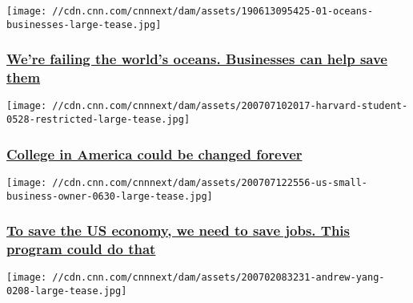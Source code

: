 \texttt{[image: //cdn.cnn.com/cnnnext/dam/assets/190613095425-01-oceans-businesses-large-tease.jpg]}

\hypertarget{were-failing-the-worlds-oceans-businesses-can-help-save-them}{%
\subsubsection{\texorpdfstring{\href{/2019/06/14/perspectives/marc-benioff-marco-lambertini-oceans-businesses/index.html}{We're
failing the world's oceans. Businesses can help save
them}}{We're failing the world's oceans. Businesses can help save them}}\label{were-failing-the-worlds-oceans-businesses-can-help-save-them}}

\href{/2020/07/07/perspectives/higher-education-pandemic/index.html}{}

\texttt{[image: //cdn.cnn.com/cnnnext/dam/assets/200707102017-harvard-student-0528-restricted-large-tease.jpg]}

\hypertarget{college-in-america-could-be-changed-forever}{%
\subsubsection{\texorpdfstring{\href{/2020/07/07/perspectives/higher-education-pandemic/index.html}{College
in America could be changed
forever}}{College in America could be changed forever}}\label{college-in-america-could-be-changed-forever}}

\href{/2020/07/07/perspectives/employee-retention-programs-us-economy/index.html}{}

\texttt{[image: //cdn.cnn.com/cnnnext/dam/assets/200707122556-us-small-business-owner-0630-large-tease.jpg]}

\hypertarget{to-save-the-us-economy-we-need-to-save-jobs-this-program-could-do-that}{%
\subsubsection{\texorpdfstring{\href{/2020/07/07/perspectives/employee-retention-programs-us-economy/index.html}{To
save the US economy, we need to save jobs. This program could do
that}}{To save the US economy, we need to save jobs. This program could do that}}\label{to-save-the-us-economy-we-need-to-save-jobs-this-program-could-do-that}}

\href{/2020/07/02/perspectives/andrew-yang-coronavirus-aid-direct-payments/index.html}{}

\texttt{[image: //cdn.cnn.com/cnnnext/dam/assets/200702083231-andrew-yang-0208-large-tease.jpg]}

